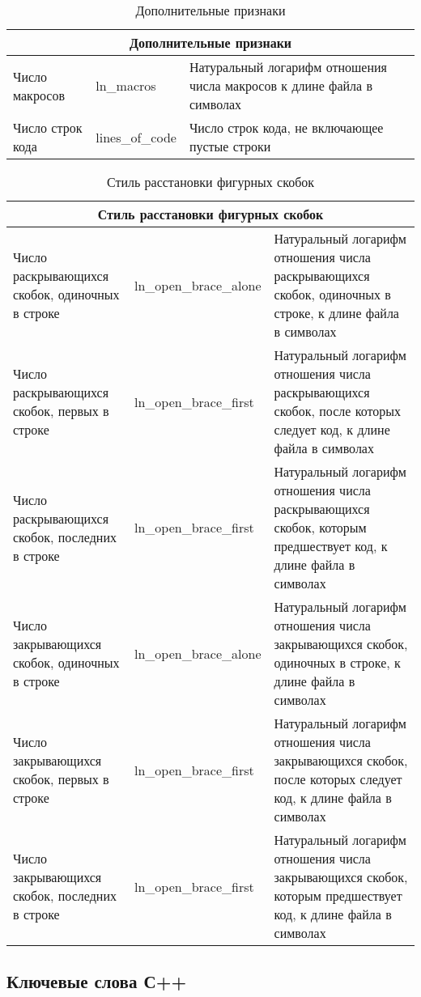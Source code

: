 \begin{table}[ht]
\caption{ Дополнительные признаки }
\label{tab:4}
\begin{center}
\begin{tabularx}{\linewidth}{|X|X|X|}
\hline
\multicolumn{3}{|c|}{Дополнительные признаки} \\
\hline
Число макросов & ln\_macros & Натуральный логарифм отношения числа макросов к длине файла в символах \\
\hline
Число строк кода & lines\_of\_code & Число строк кода, не включающее пустые строки\\
\hline
\end{tabularx}
\end{center}
\end{table}

\begin{table}[h!]
\caption{ Стиль расстановки фигурных скобок }
\label{tab:2}
\begin{center}
\begin{tabularx}{\linewidth}{|X|X|X|}
\hline
\multicolumn{3}{|c|}{Стиль расстановки фигурных скобок} \\
\hline
Число раскрывающихся скобок, одиночных в строке & ln\_open\_brace\_alone & Натуральный логарифм отношения числа раскрывающихся скобок, одиночных в строке, к длине файла в символах \\
\hline
Число раскрывающихся скобок, первых в строке & ln\_open\_brace\_first & Натуральный логарифм отношения числа раскрывающихся скобок, после которых следует код, к длине файла в символах \\
\hline
Число раскрывающихся скобок, последних в строке & ln\_open\_brace\_first & Натуральный логарифм отношения числа раскрывающихся скобок, которым предшествует код, к длине файла в символах \\
\hline
Число закрывающихся скобок, одиночных в строке & ln\_open\_brace\_alone & Натуральный логарифм отношения числа закрывающихся скобок, одиночных в строке, к длине файла в символах \\
\hline
Число закрывающихся скобок, первых в строке & ln\_open\_brace\_first & Натуральный логарифм отношения числа закрывающихся скобок, после которых следует код, к длине файла в символах \\
\hline
Число закрывающихся скобок, последних в строке & ln\_open\_brace\_first & Натуральный логарифм отношения числа закрывающихся скобок, которым предшествует код, к длине файла в символах \\
\hline
\end{tabularx}
\end{center}
\end{table}


\clearpage
\subsection{Ключевые слова С++}\label{keycpp}
